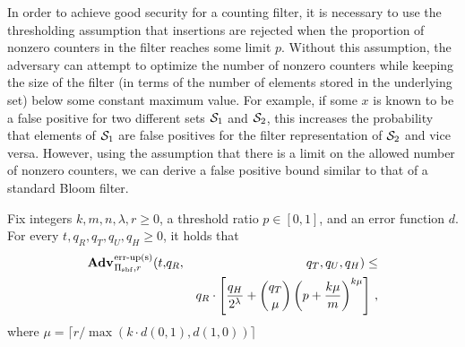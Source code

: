 In order to achieve good security for a counting filter, it is necessary to use
the thresholding assumption that insertions are rejected when the proportion of
nonzero counters in the filter reaches some limit $p$. Without this assumption,
the adversary can attempt to optimize the number of nonzero counters while
keeping the size of the filter (in terms of the number of elements stored in the
underlying set) below some constant maximum value. For example, if some $x$ is
known to be a false positive for two different sets $\mathcal{S}_1$ and $\mathcal{S}_2$, this
increases the probability that elements of $\mathcal{S}_1$ are false positives for the
filter representation of $\mathcal{S}_2$ and vice versa. However, using the assumption
that there is a limit on the allowed number of nonzero counters, we can derive a
false positive bound similar to that of a standard Bloom filter.

\begin{theorem}\label{thm:count-bf-bound}
Fix integers $k, m, n, \lambda, r\geq 0$, a threshold ratio $p \in [0,1]$, and an error function $d$.
  For every $t, q_R, q_T, q_U, q_H \geq 0$, it holds that
  \begin{eqnarray*}
    \Adv{\erreps}_{\struct_\saltybloom,r}(t,&q_R,& q_T, q_U, q_H) \leq \\ && q_R \cdot \left[\frac{q_H}{2^\lambda} + \binom{q_T}{\mu}\left(p+\frac{k\mu}{m}\right)^{k\mu}\right] \,,
\end{eqnarray*}
where $\mu = \lceil r/\max(k \cdot d(0,1), d(1,0)) \rceil$
\end{theorem}

